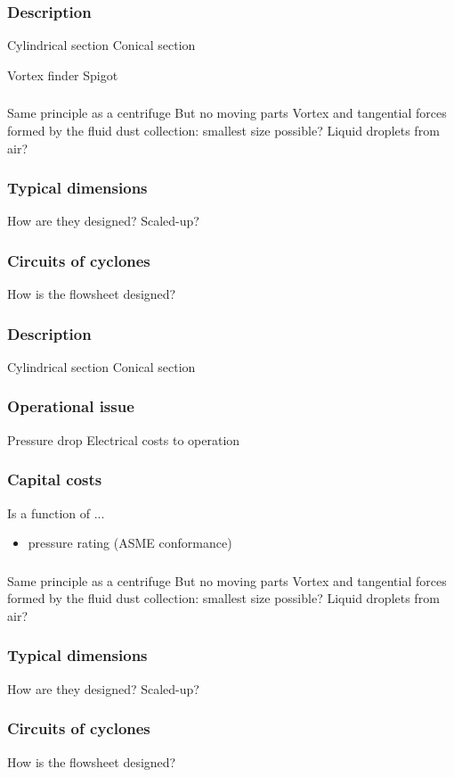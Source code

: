\begin{frame}\frametitle{Description}
	Cylindrical section
	Conical section
	
	Vortex finder
	Spigot
\end{frame}


\begin{frame}\frametitle{}
	Same principle as a centrifuge
	But no moving parts
	Vortex and tangential forces formed by the fluid
	dust collection: smallest size possible?
	Liquid droplets from air?
	
\end{frame}

\begin{frame}\frametitle{Typical dimensions}
	How are they designed?
	Scaled-up?
	
	
\end{frame}

\begin{frame}\frametitle{Circuits of cyclones}
	How is the flowsheet designed?
	
\end{frame}



\begin{frame}\frametitle{Description}
	Cylindrical section
	Conical section
\end{frame}

\begin{frame}\frametitle{Operational issue}
	Pressure drop
	Electrical costs to operation
\end{frame}

\begin{frame}\frametitle{Capital costs}
	Is a function of ...
	\begin{itemize}
		\item	pressure rating (ASME conformance)
	\end{itemize}
\end{frame}

\begin{frame}\frametitle{}
	Same principle as a centrifuge
	But no moving parts
	Vortex and tangential forces formed by the fluid
	dust collection: smallest size possible?
	Liquid droplets from air?
	
\end{frame}

\begin{frame}\frametitle{Typical dimensions}
	How are they designed?
	Scaled-up?	
\end{frame}


\begin{frame}\frametitle{Circuits of cyclones}
	How is the flowsheet designed?
	
\end{frame}


